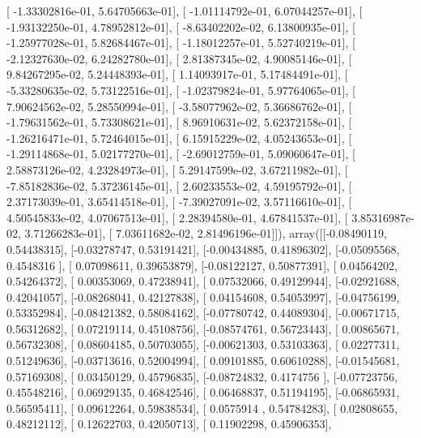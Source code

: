 \documentclass{article}
\begin{document}
       [ -1.33302816e-01,   5.64705663e-01],
       [ -1.01114792e-01,   6.07044257e-01],
       [ -1.93132250e-01,   4.78952812e-01],
       [ -8.63402202e-02,   6.13800935e-01],
       [ -1.25977028e-01,   5.82684467e-01],
       [ -1.18012257e-01,   5.52740219e-01],
       [ -2.12327630e-02,   6.24282780e-01],
       [  2.81387345e-02,   4.90085146e-01],
       [  9.84267295e-02,   5.24448393e-01],
       [  1.14093917e-01,   5.17484491e-01],
       [ -5.33280635e-02,   5.73122516e-01],
       [ -1.02379824e-01,   5.97764065e-01],
       [  7.90624562e-02,   5.28550994e-01],
       [ -3.58077962e-02,   5.36686762e-01],
       [ -1.79631562e-01,   5.73308621e-01],
       [  8.96910631e-02,   5.62372158e-01],
       [ -1.26216471e-01,   5.72464015e-01],
       [  6.15915229e-02,   4.05243653e-01],
       [ -1.29114868e-01,   5.02177270e-01],
       [ -2.69012759e-01,   5.09060647e-01],
       [  2.58873126e-02,   4.23284973e-01],
       [  5.29147599e-02,   3.67211982e-01],
       [ -7.85182836e-02,   5.37236145e-01],
       [  2.60233553e-02,   4.59195792e-01],
       [  2.37173039e-01,   3.65414518e-01],
       [ -7.39027091e-02,   3.57116610e-01],
       [  4.50545833e-02,   4.07067513e-01],
       [  2.28394580e-01,   4.67841537e-01],
       [  3.85316987e-02,   3.71266283e-01],
       [  7.03611682e-02,   2.81496196e-01]]), array([[-0.08490119,  0.54438315],
       [-0.03278747,  0.53191421],
       [-0.00434885,  0.41896302],
       [-0.05095568,  0.4548316 ],
       [ 0.07098611,  0.39653879],
       [-0.08122127,  0.50877391],
       [ 0.04564202,  0.54264372],
       [ 0.00353069,  0.47238941],
       [ 0.07532066,  0.49129944],
       [-0.02921688,  0.42041057],
       [-0.08268041,  0.42127838],
       [ 0.04154608,  0.54053997],
       [-0.04756199,  0.53352984],
       [-0.08421382,  0.58084162],
       [-0.07780742,  0.44089304],
       [-0.00671715,  0.56312682],
       [ 0.07219114,  0.45108756],
       [-0.08574761,  0.56723443],
       [ 0.00865671,  0.56732308],
       [ 0.08604185,  0.50703055],
       [-0.00621303,  0.53103363],
       [ 0.02277311,  0.51249636],
       [-0.03713616,  0.52004994],
       [ 0.09101885,  0.60610288],
       [-0.01545681,  0.57169308],
       [ 0.03450129,  0.45796835],
       [-0.08724832,  0.4174756 ],
       [-0.07723756,  0.45548216],
       [ 0.06929135,  0.46842546],
       [ 0.06468837,  0.51194195],
       [-0.06865931,  0.56595411],
       [ 0.09612264,  0.59838534],
       [ 0.0575914 ,  0.54784283],
       [ 0.02808655,  0.48212112],
       [ 0.12622703,  0.42050713],
       [ 0.11902298,  0.45906353],
\end{document}
